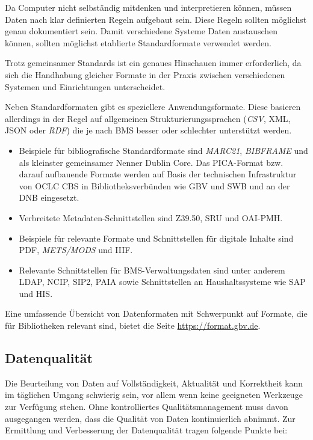 \documentclass[
  11pt,
  letterpaper,
  DIV=11,
  twoside]{scrreprt}
\begin{document}
Da Computer nicht selbständig mitdenken und interpretieren können,
müssen Daten nach klar definierten Regeln aufgebaut sein. Diese Regeln
sollten möglichst genau dokumentiert sein. Damit verschiedene Systeme
Daten austauschen können, sollten möglichst etablierte Standardformate
verwendet werden.

Trotz gemeinsamer Standards ist ein genaues Hinschauen immer
erforderlich, da sich die Handhabung gleicher Formate in der Praxis
zwischen verschiedenen Systemen und Einrichtungen unterscheidet.

Neben Standardformaten gibt es speziellere Anwendungsformate. Diese
basieren allerdings in der Regel auf allgemeinen Strukturierungssprachen
(\emph{CSV}, {XML}, {JSON} oder \emph{RDF}) die je nach BMS besser oder
schlechter unterstützt werden.

\begin{itemize}
\item
  Beispiele für bibliografische Standardformate sind \emph{MARC21},
  \emph{BIBFRAME} und als kleinster gemeinsamer Nenner Dublin Core. Das
  PICA-Format bzw. darauf aufbauende Formate werden auf Basis der
  technischen Infrastruktur von OCLC CBS in Bibliotheksverbünden wie GBV
  und SWB und an der DNB eingesetzt.
\item
  Verbreitete Metadaten-Schnittstellen sind {Z39.50}, {SRU} und
  {OAI-PMH}.
\item
  Beispiele für relevante Formate und Schnittstellen für digitale
  Inhalte sind PDF, \emph{METS/MODS} und {IIIF}.
\item
  Relevante Schnittstellen für BMS-Verwaltungsdaten sind unter anderem
  {LDAP}, {NCIP}, {SIP2}, {PAIA} sowie Schnittstellen an
  Haushaltssysteme wie {SAP} und {HIS}.
\end{itemize}

Eine umfassende Übersicht von Datenformaten mit Schwerpunkt auf Formate,
die für Bibliotheken relevant sind, bietet die Seite
\url{https://format.gbv.de}.

\subsection{Datenqualität}\label{datenqualituxe4t}

Die Beurteilung von Daten auf Vollständigkeit, Aktualität und
Korrektheit kann im täglichen Umgang schwierig sein, vor allem wenn
keine geeigneten Werkzeuge zur Verfügung stehen. Ohne kontrolliertes
Qualitätsmanagement muss davon ausgegangen werden, dass die Qualität von
Daten kontinuierlich abnimmt. Zur Ermittlung und Verbesserung der
Datenqualität tragen folgende Punkte bei:
\end{document}
